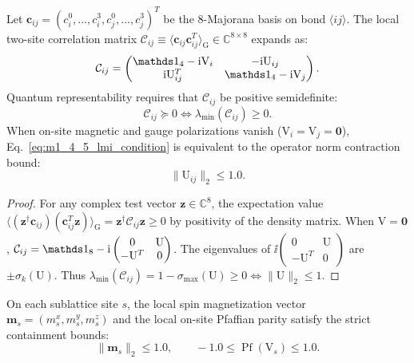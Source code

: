 \begin{theorem}
\label{thm:m1_4_5_two_site_lmi}
Let $\mathbf{c}_{ij} = (c_i^0, \dots, c_i^3, c_j^0, \dots, c_j^3)^T$ be the 8-Majorana basis on bond $\langle ij \rangle$. The local two-site correlation matrix $\mathcal{C}_{ij} \equiv \langle \mathbf{c}_{ij} \mathbf{c}_{ij}^T \rangle_{\mathrm{G}} \in \mathbb{C}^{8 \times 8}$ expands as:
\begin{equation}
\label{eq:m1_4_5_two_site_C_matrix}
\mathcal{C}_{ij} = \begin{pmatrix} \Id_4 - \ii \mathrm{V}_i & -\ii \mathrm{U}_{ij} \\ \ii \mathrm{U}_{ij}^T & \Id_4 - \ii \mathrm{V}_j \end{pmatrix}.
\end{equation}
Quantum representability requires that $\mathcal{C}_{ij}$ be positive semidefinite:
\begin{equation}
\label{eq:m1_4_5_lmi_condition}
\mathcal{C}_{ij} \succeq 0 \iff \lambda_{\min}(\mathcal{C}_{ij}) \ge 0.
\end{equation}
When on-site magnetic and gauge polarizations vanish ($\mathrm{V}_i = \mathrm{V}_j = \mathbf{0}$), Eq.~\eqref{eq:m1_4_5_lmi_condition} is equivalent to the operator norm contraction bound:
\begin{equation}
\label{eq:m1_4_5_operator_norm_bound}
\|\mathrm{U}_{ij}\|_2 \le 1.0.
\end{equation}
\end{theorem}
\begin{proof}
For any complex test vector $\mathbf{z} \in \mathbb{C}^8$, the expectation value $\langle (\mathbf{z}^\dagger \mathbf{c}_{ij})(\mathbf{c}_{ij}^T \mathbf{z}) \rangle_{\mathrm{G}} = \mathbf{z}^\dagger \mathcal{C}_{ij} \mathbf{z} \ge 0$ by positivity of the density matrix. When $\mathrm{V} = \mathbf{0}$, $\mathcal{C}_{ij} = \Id_8 - \ii \begin{pmatrix} 0 & \mathrm{U} \\ -\mathrm{U}^T & 0 \end{pmatrix}$. The eigenvalues of $\ii \begin{pmatrix} 0 & \mathrm{U} \\ -\mathrm{U}^T & 0 \end{pmatrix}$ are $\pm \sigma_k(\mathrm{U})$. Thus $\lambda_{\min}(\mathcal{C}_{ij}) = 1 - \sigma_{\max}(\mathrm{U}) \ge 0 \iff \|\mathrm{U}\|_2 \le 1$.
\end{proof}

\begin{proposition}
\label{prop:m1_4_5_parity_envelopes}
On each sublattice site $s$, the local spin magnetization vector $\mathbf{m}_s = (m_s^x, m_s^y, m_s^z)$ and the local on-site Pfaffian parity satisfy the strict containment bounds:
\begin{equation}
\label{eq:m1_4_5_bloch_pfaffian_envelopes}
\|\mathbf{m}_s\|_2 \le 1.0, \qquad -1.0 \le \operatorname{Pf}(\mathrm{V}_s) \le 1.0.
\end{equation}
\end{proposition}

